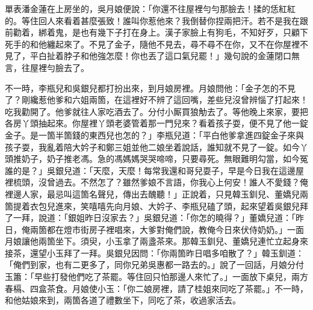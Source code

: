 單表潘金蓮在上房坐的，吳月娘便說：「你還不往屋裡勻勻那臉去！揉的恁紅紅的。等住回人來看着甚麼張致！誰叫你惹他來？我倒替你捏兩把汗。若不是我在跟前勸着，綁着鬼，是也有幾下子打在身上。漢子家臉上有狗毛，不知好歹，{}只顧下死手的和他纏起來了。不見了金子，隨他不見去，尋不尋不在你，又不在你屋裡不見了，平白扯着脖子和他強怎麼！你也丟了這口氣兒罷！」{}幾句說的金蓮閉口無言，往屋裡勻臉去了。

不一時，李瓶兒和吳銀兒都打扮出來，到月娘房裡。月娘問他：「金子怎的不見了？剛纔惹他爹和六姐兩箇，在這裡好不辨了這回嘴，差些兒沒曾辨惱了打起來！吃我勸開了。他爹就往人家吃酒去了。分付小厮買狼觔去了。等他晚上來家，要把各房丫頭抽起來。你屋裡丫頭老婆管着那一門兒來？看着孩子耍，便不見了他一錠金子。是一箇半箇錢的東西兒也怎的？」李瓶兒道：「平白他爹拿進四錠金子來與孩子耍，我亂着陪大妗子和鄭三姐並他二娘坐着說話，誰知就不見了一錠。如今丫頭推奶子，奶子推老馮。急的馮媽媽哭哭啼啼，只要尋死。無眼難明勾當，如今冤誰的是？」{}吳銀兒道：「天麼，天麼！每常我還和哥兒耍子，早是今日我在這邊屋裡梳頭，沒曾過去。不然怎了？雖然爹娘不言語，你我心上何安！誰人不愛錢？俺裡邊人家，最忌叫這箇名聲兒，傳出去醜聽！」正說着，只見韓玉釧兒、董嬌兒兩箇提着衣包兒進來，笑嘻嘻先向月娘、大妗子、李瓶兒磕了頭，起來望着吳銀兒拜了一拜，說道：「銀姐昨日沒家去？」吳銀兒道：「你怎的曉得？」董嬌兒道：「昨日，俺兩箇都在燈市街房子裡唱來，大爹對俺們說，教俺今日來伏侍奶奶。」一面月娘讓他兩箇坐下。須臾，小玉拿了兩盞茶來。那韓玉釧兒、董嬌兒連忙立起身來接茶，還望小玉拜了一拜。吳銀兒因問：「你兩箇昨日唱多咱散了？」韓玉釧道：「俺們到家，也有二更多了，同你兄弟吳惠都一路去的。」說了一回話，月娘分付玉簫：「早些打發他們吃了茶罷。等住回只怕那邊人來忙了。」一面放下桌兒，兩方春槅、四盒茶食。月娘使小玉：「你二娘房裡，請了桂姐來同吃了茶罷。」不一時，和他姑娘來到，兩箇各道了禮數坐下，同吃了茶，收過家活去。

